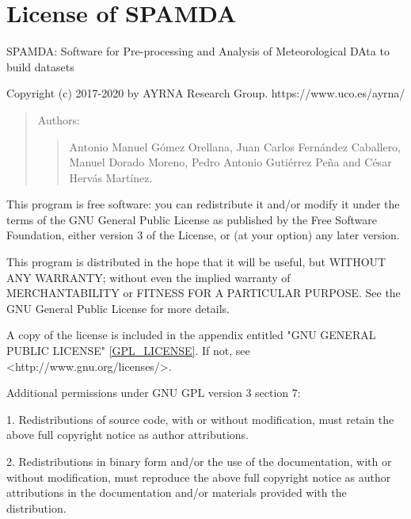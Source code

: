 \chapter{License of SPAMDA} \label{licenseGPLSPAMDA}

\parindent=0pt

\small

SPAMDA: Software for Pre-processing and Analysis of Meteorological DAta to build datasets

Copyright (c) 2017-2020 by AYRNA Research Group. https://www.uco.es/ayrna/
	\begin{quote}
	Authors: 
		\begin{quote}
			Antonio Manuel Gómez Orellana, Juan Carlos Fernández Caballero,
			Manuel Dorado Moreno, Pedro Antonio Gutiérrez Peña and 
			César Hervás Martínez.
		\end{quote}
	\end{quote}

This program is free software: you can redistribute it and/or modify it under the
terms of the GNU General Public License as published by the Free Software Foundation,
either version 3 of the License, or (at your option) any later version.

This program is distributed in the hope that it will be useful, but WITHOUT ANY WARRANTY;
without even the implied warranty of MERCHANTABILITY or FITNESS FOR A PARTICULAR PURPOSE.
See the GNU General Public License for more details.

A copy of the license is included in the appendix entitled "GNU GENERAL PUBLIC LICENSE" \ref{GPL_LICENSE}.
If not, see <http://www.gnu.org/licenses/>.

Additional permissions under GNU GPL version 3 section 7:

1. Redistributions of source code, with or without modification, must retain
the above full copyright notice as author attributions.

2. Redistributions in binary form and/or the use of the documentation,
with or without modification, must reproduce the above full copyright notice
as author attributions in the documentation and/or materials provided with
the distribution.

